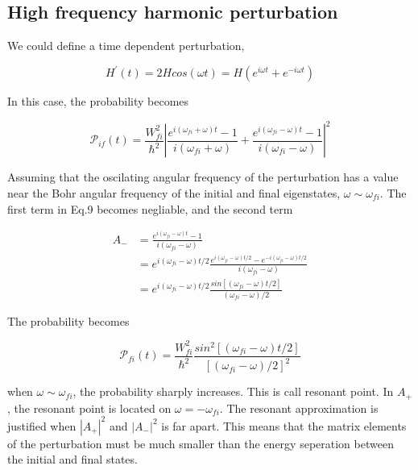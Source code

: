 \documentclass{article}
\begin{document}
	\subsection{High frequency harmonic perturbation}

		We could define a time dependent perturbation,

		\begin{equation}
			H^{'}(t) = 2Hcos(\omega t) = H(e^{i\omega t} + e^{-i\omega t})
		\end{equation}

		In this case, the probability becomes

		\begin{equation}
			\mathscr{P}_{if}(t) = \frac{W_{fi}^{2}}{\hbar^{2}}|\frac{e^{i(\omega_{fi} + \omega)t} - 1}{i(\omega_{fi} + \omega)} + \frac{e^{i(\omega_{fi} - \omega)t} - 1}{i(\omega_{fi} - \omega)}|^{2}
		\end{equation}

		Assuming that the oscilating angular frequency of the perturbation has a value near the Bohr angular frequency of the initial and final eigenstates, $\omega \sim \omega_{fi}$. The first term in Eq.9 becomes negliable, and the second term

		\begin{equation}
		\begin{aligned}
			A_{-} &= \frac{e^{i(\omega_{fi} - \omega)t} - 1}{i(\omega_{fi} - \omega)}\\
				  &= e^{i(\omega_{fi} - \omega)t/2}\frac{e^{i(\omega_{fi} - \omega)t/2} - e^{-i(\omega_{fi} - \omega)t/2}}{i(\omega_{fi} - \omega)}\\
				  &= e^{i(\omega_{fi} - \omega)t/2}\frac{sin[(\omega_{fi} - \omega)t/2]}{(\omega_{fi} - \omega)/2}
		\end{aligned}
		\end{equation}

		The probability becomes

		\begin{equation}
			\mathscr{P}_{fi}(t) = \frac{W_{fi}^{2}}{\hbar^{2}}\frac{sin^{2}[(\omega_{fi} - \omega)t/2]}{[(\omega_{fi} - \omega)/2]^{2}}
		\end{equation}

		when $\omega \sim \omega_{fi}$, the probability sharply increases. This is call resonant point. In $A_{+}$, the resonant point is located on $\omega = -\omega_{fi}$. The resonant approximation is justified when $|A_{+}|^{2}$ and $|A_{-}|^{2}$ is far apart. This means that the matrix elements of the perturbation must be much smaller than the energy seperation between the initial and final states.
\end{document}
